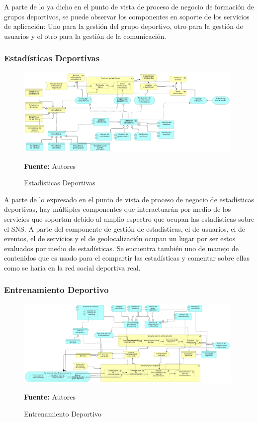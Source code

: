 A parte de lo ya dicho en el punto de vista de proceso de negocio de formación de grupos deportivos, se puede observar los componentes en soporte de los servicios de aplicación: Uno para la gestión del grupo deportivo, otro para la gestión de usuarios y el otro para la gestión de la comunicación.

\subsubsection{Estadísticas Deportivas}

\begin{figure}[!htb]
  \begin{center}
    \includegraphics[width=11cm]{./imagenes/application_usage/estadisticasdeportivas.png}
    \caption{Estadísticas Deportivas}
    \label{fig:au_estadisticas_deportivas}
    \textbf{Fuente:}  Autores
  \end{center}
\end{figure}

A parte de lo expresado en el punto de vista de proceso de negocio de estadísticas deportivas, hay múltiples componentes que interactuarán por medio de los servicios que soportan debido al amplio espectro que ocupan las estadísticas sobre el SNS. A parte del componente de gestión de estadísticas, el de usuarios, el de eventos, el de servicios y el de geolocalización ocupan un lugar por ser estos evaluados por medio de estadísticas. Se encuentra también uno de manejo de contenidos que es usado para el compartir las estadísticas y comentar sobre ellas como se haría en la red social deportiva real.

\subsubsection{Entrenamiento Deportivo}

\begin{figure}[!htb]
  \begin{center}
    \includegraphics[width=11cm]{./imagenes/application_usage/entrenamientodeportivo.png}
    \caption{Entrenamiento Deportivo}
    \label{fig:au_entrenamiento_deportivo}
    \textbf{Fuente:}  Autores
  \end{center}
\end{figure}

